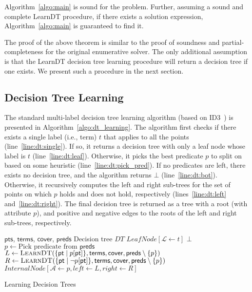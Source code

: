 \documentclass{llncs}
\newcommand\Points{\mathsf{pts}}
\newcommand\Point{\mathsf{pt}}
\newcommand\Predicates{\mathsf{preds}}
\newcommand\Pred{p}
\newcommand\Terms{\mathsf{terms}}
\newcommand\Term{t}
\newcommand\Cover{\mathsf{cover}}
\newcommand\DecisionTree{\mathit{DT}}
\newcommand\Attribute{\mathcal{A}}
\newcommand\Label{\mathcal{L}}
\newcommand{\sygus}{{\sffamily\fontsize{8.5}{10}\selectfont
    SyGuS}\xspace}
\begin{document}
\begin{theorem}
  Algorithm~\ref{algo:main} is sound for the {\upshape\sygus} problem.
  Further, assuming a sound and complete {\sc LearnDT} procedure, if
  there exists a solution expression, Algorithm~\ref{algo:main} is
  guaranteed to find it.
\end{theorem}
The proof of the above theorem is similar to the proof of soundness and
partial-completeness for the original enumerative solver.
The only additional assumption is that the {\sc LearnDT} decision tree
learning procedure will return a decision tree if one exists.
We present such a procedure in the next section.


\subsection{Decision Tree Learning}
\label{sec:decision_trees}

The standard multi-label decision tree learning algorithm (based on
ID3~\cite{quinlan-86}) is presented in Algorithm~\ref{algo:dt_learning}.
The algorithm first checks if there exists a single label (i.e., term)
$\Term$ that applies to all the points (line~\ref{line:dt:single}).
If so, it returns a decision tree with only a leaf node whose label is
$\Term$ (line~\ref{line:dt:leaf}).
Otherwise, it picks the best predicate $\Pred$ to split on based on some
heuristic (line~\ref{line:dt:pick_pred}).
If no predicates are left, there exists no decision tree, and the
algorithm returns $\bot$ (line~\ref{line:dt:bot}).
Otherwise, it recursively computes the left and right sub-trees for the set of
points on which $\Pred$ holds and does not hold, respectively
(lines~\ref{line:dt:left} and~\ref{line:dt:right}).
The final decision tree is returned as a tree with a root (with
attribute $\Pred$), and positive and negative edges to the roots of the
left and right sub-trees, respectively.

\begin{algorithm}
  \begin{algorithmic}[1]
    \fontsize{8}{10}\selectfont
    \Require $\Points$, $\Terms$, $\Cover$, $\Predicates$
    \Ensure Decision tree $\DecisionTree$
    \If { $\exists \Term : \Points \subseteq \Cover[\Term]$ }\label{line:dt:single}
    \Return $\mathit{LeafNode}[\Label \gets \Term]$ \label{line:dt:leaf}
    \EndIf
    \If {$\Predicates = \emptyset$} \Return $\bot$ \EndIf \label{line:dt:bot}
    \State $\Pred \gets \mbox{Pick predicate from $\Predicates$}$\label{line:dt:pick_pred}
    \State $L \gets \Call{LearnDT}{\{ \Point \mid \Pred[\Point] \},
    \Terms, \Cover, \Predicates \setminus \{ \Pred \} }$\label{line:dt:left}
    \State $R \gets \Call{LearnDT}{\{ \Point \mid \neg \Pred[\Point]
    \}, \Terms, \Cover, \Predicates \setminus \{ \Pred \} }$\label{line:dt:right}
    \State \Return $\mathit{InternalNode}[\Attribute \gets \Pred,  \mathit{left} \gets L , \mathit{right} \gets R ]$
  \end{algorithmic}
  \caption{Learning Decision Trees}
  \label{algo:dt_learning}
\end{algorithm}
\end{document}
